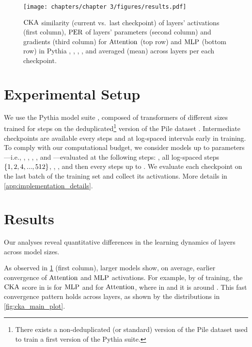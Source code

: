 \begin{figure*}[h!]
    \centering
    \texttt{[image: chapters/chapter 3/figures/results.pdf]}
    \vspace{-15pt}
    \caption{$\mathrm{CKA}$ similarity (current vs.\ last checkpoint) of layers' activations (first column), $\mathrm{PER}$ of layers' parameters (second column) and gradients (third column) for $\mathrm{Attention}$ (top row) and $\mathrm{MLP}$ (bottom row) in Pythia \sevenmil, \sixmil, \fourmil, \onebil, and \twobil averaged (mean) across layers per each checkpoint.}
    \label{fig:main-results}
\end{figure*}


\section{Experimental Setup}\label{sec:experimental_setup}

We use the Pythia model suite \citep{biderman2023pythia}, composed of  transformers of different sizes trained for  steps on the deduplicated\footnote{There exists a non-deduplicated (or standard) version of the Pile dataset used to train a first version of the Pythia suite.} version of the Pile dataset \citep{gao2020pile}.
Intermediate checkpoints are available every  steps and at log-spaced intervals early in training.
To comply with our computational budget, we consider models up to  parameters---i.e., \sevenmil, \sixmil, \fourmil, \onebil, and \twobil---evaluated at the following steps: , all log-spaced steps $\{1, 2, 4, ..., 512\}$, , , and then every  steps up to .
We evaluate each checkpoint on the last batch of the training set and collect its activations.
More details in \cref{app:implementation_details}.

\section{Results}\label{sec:results}

Our analyses reveal quantitative differences in the learning dynamics of layers across model sizes.


\begin{result}
\label{result:cka}
As observed in \cref{fig:main-results} (first column), larger models show, on average, earlier convergence of $\mathrm{Attention}$ and $\mathrm{MLP}$ activations. For example, by  of training, the $\mathrm{CKA}$ score in \twobil is  for $\mathrm{MLP}$ and  for $\mathrm{Attention}$, where in \sevenmil and \sixmil it is around .
This fast convergence pattern holds across layers, as shown by the distributions in \cref{fig:cka_main_plot}.
\end{result}

